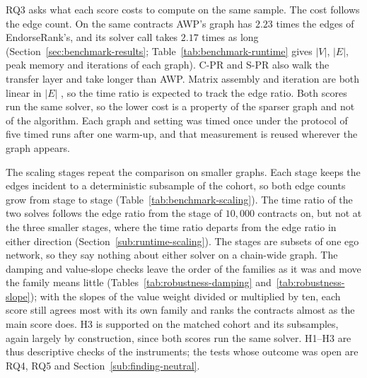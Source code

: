 
RQ3 asks what each score costs to compute on the same sample. The cost follows the edge count. On the same contracts AWP's graph has $2.23$ times the edges of EndorseRank's, and its solver call takes $2.17$ times as long (Section~\ref{sec:benchmark-results}; Table~\ref{tab:benchmark-runtime} gives $|V|$, $|E|$, peak memory and iterations of each graph). C-PR and S-PR also walk the transfer layer and take longer than AWP. Matrix assembly and iteration are both linear in $|E|$ \parencite{langville2006pagerank}, so the time ratio is expected to track the edge ratio. Both scores run the same solver, so the lower cost is a property of the sparser graph and not of the algorithm. Each graph and setting was timed once under the protocol of five timed runs after one warm-up, and that measurement is reused wherever the graph appears.

The scaling stages repeat the comparison on smaller graphs. Each stage keeps the edges incident to a deterministic subsample of the cohort, so both edge counts grow from stage to stage (Table~\ref{tab:benchmark-scaling}). The time ratio of the two solves follows the edge ratio from the stage of $10{,}000$ contracts on, but not at the three smaller stages, where the time ratio departs from the edge ratio in either direction (Section~\ref{sub:runtime-scaling}). The stages are subsets of one ego network, so they say nothing about either solver on a chain-wide graph. The damping and value-slope checks leave the order of the families as it was and move the family means little (Tables~\ref{tab:robustness-damping} and~\ref{tab:robustness-slope}); with the slopes of the value weight divided or multiplied by ten, each score still agrees most with its own family and ranks the contracts almost as the main score does. H3 is supported on the matched cohort and its subsamples, again largely by construction, since both scores run the same solver. H1--H3 are thus descriptive checks of the instruments; the tests whose outcome was open are RQ4, RQ5 and Section~\ref{sub:finding-neutral}.


